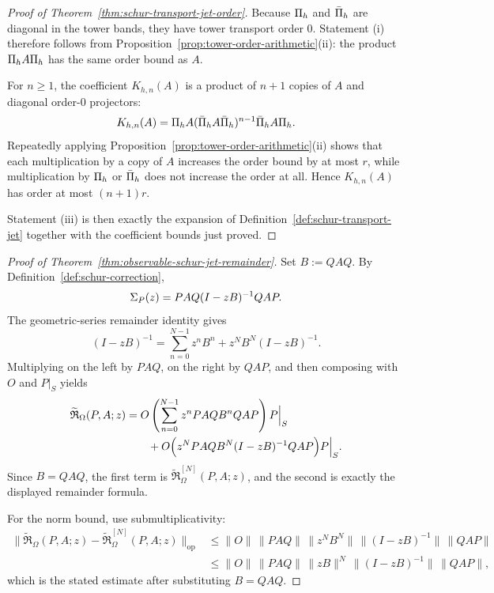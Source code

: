 \begin{proof}[Proof of Theorem~\ref{thm:schur-transport-jet-order}]
\label{proof:thm:schur-transport-jet-order}
Because $\Pi_{h}$ and $\bar{\Pi}_{h}$ are diagonal in the tower bands, they have
tower transport order $0$. Statement (i) therefore follows from
Proposition~\ref{prop:tower-order-arithmetic}(ii): the product
$\Pi_{h}A\Pi_{h}$ has the same order bound as $A$.

For $n\ge1$, the coefficient $K_{h,n}(A)$ is a product of $n+1$ copies of $A$
and diagonal order-$0$ projectors:
\[
K_{h,n}(A)
=
\Pi_{h}A(\bar{\Pi}_{h}A\bar{\Pi}_{h})^{n-1}\bar{\Pi}_{h}A\Pi_{h}.
\]
Repeatedly applying Proposition~\ref{prop:tower-order-arithmetic}(ii) shows
that each multiplication by a copy of $A$ increases the order bound by at most
$r$, while multiplication by $\Pi_{h}$ or $\bar{\Pi}_{h}$ does not increase the
order at all. Hence $K_{h,n}(A)$ has order at most $(n+1)r$.

Statement (iii) is then exactly the expansion of
Definition~\ref{def:schur-transport-jet} together with the coefficient bounds
just proved.
\end{proof}

\begin{proof}[Proof of Theorem~\ref{thm:observable-schur-jet-remainder}]
\label{proof:thm:observable-schur-jet-remainder}
Set \(B:=QAQ\). By Definition~\ref{def:schur-correction},
\[
\Sigma_{P}(z)=PAQ(I-zB)^{-1}QAP.
\]
The geometric-series remainder identity gives
\[
(I-zB)^{-1}
=
\sum_{n=0}^{N-1} z^n B^n
+
z^N B^N (I-zB)^{-1}.
\]
Multiplying on the left by \(PAQ\), on the right by \(QAP\), and then
composing with \(O\) and \(P\big|_S\) yields
\begin{align*}
\widetilde{\mathfrak R}_{\Omega}(P,A;z)
&=
O\left(
\sum_{n=0}^{N-1} z^n PAQ B^n QAP
\right)P\Big|_{S} \\
&\qquad
+
O\Bigl(
z^N PAQ B^N (I-zB)^{-1}QAP
\Bigr)P\Big|_{S}.
\end{align*}
Since \(B=QAQ\), the first term is
\(\widetilde{\mathfrak R}_{\Omega}^{[N]}(P,A;z)\), and the second is exactly
the displayed
remainder formula.

For the norm bound, use submultiplicativity:
\begin{align*}
\bigl\|
\widetilde{\mathfrak R}_{\Omega}(P,A;z)
-\widetilde{\mathfrak R}_{\Omega}^{[N]}(P,A;z)
\bigr\|_{\mathrm{op}}
&\le
\|O\|\,
\|PAQ\|\,
\|z^N B^N\|\,
\|(I-zB)^{-1}\|\,
\|QAP\| \\
&\le
\|O\|\,
\|PAQ\|\,
\|zB\|^N\,
\|(I-zB)^{-1}\|\,
\|QAP\|,
\end{align*}
which is the stated estimate after substituting \(B=QAQ\).
\end{proof}


